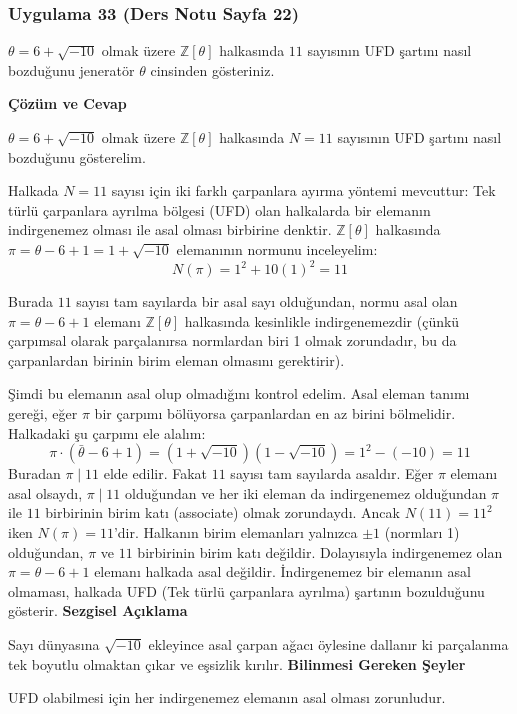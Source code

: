 \documentclass[11pt, a4paper]{article}
\newenvironment{cozum}{
    \vspace{0.5cm}
    \noindent\textcolor{green!60!black}{\faCheckCircle\enspace \textbf{\Large Çözüm ve Cevap}}\par\vspace{0.2cm}
}{}
\newenvironment{sezgisel}{
    \vspace{0.5cm}
    \noindent\textcolor{orange!80!black}{\faLightbulb\enspace \textbf{\Large Sezgisel Açıklama}}\par\vspace{0.2cm}
    \itshape
}{}
\newenvironment{bilgi}{
    \vspace{0.5cm}
    \noindent\textcolor{red!70!black}{\faExclamationTriangle\enspace \textbf{\Large Bilinmesi Gereken Şeyler}}\par\vspace{0.2cm}
}{}
\begin{document}
\newpage
\subsubsection{Uygulama 33 (Ders Notu Sayfa 22)}
\begin{sorubox}
$\theta = 6 + \sqrt{-10}$ olmak üzere $\mathbb{Z}[\theta]$ halkasında $11$ sayısının UFD şartını nasıl bozduğunu jeneratör $\theta$ cinsinden gösteriniz.
\end{sorubox}
\begin{cozum}
$\theta = 6 + \sqrt{-10}$ olmak üzere $\mathbb{Z}[\theta]$ halkasında $N = 11$ sayısının UFD şartını nasıl bozduğunu gösterelim.

Halkada $N = 11$ sayısı için iki farklı çarpanlara ayırma yöntemi mevcuttur:
Tek türlü çarpanlara ayrılma bölgesi (UFD) olan halkalarda bir elemanın indirgenemez olması ile asal olması birbirine denktir. $\mathbb{Z}[\theta]$ halkasında $\pi = \theta - 6 + 1 = 1+\sqrt{-10}$ elemanının normunu inceleyelim:
\[ N(\pi) = 1^2 + 10(1)^2 = 11 \]

Burada $11$ sayısı tam sayılarda bir asal sayı olduğundan, normu asal olan $\pi = \theta - 6 + 1$ elemanı $\mathbb{Z}[\theta]$ halkasında kesinlikle indirgenemezdir (çünkü çarpımsal olarak parçalanırsa normlardan biri 1 olmak zorundadır, bu da çarpanlardan birinin birim eleman olmasını gerektirir).

Şimdi bu elemanın asal olup olmadığını kontrol edelim. Asal eleman tanımı gereği, eğer $\pi$ bir çarpımı bölüyorsa çarpanlardan en az birini bölmelidir. Halkadaki şu çarpımı ele alalım:
\[ \pi \cdot (\bar{\theta} - 6 + 1) = (1+\sqrt{-10})(1-\sqrt{-10}) = 1^2 - (-10) = 11 \]
Buradan $\pi \mid 11$ elde edilir. Fakat $11$ sayısı tam sayılarda asaldır. Eğer $\pi$ elemanı asal olsaydı, $\pi \mid 11$ olduğundan ve her iki eleman da indirgenemez olduğundan $\pi$ ile $11$ birbirinin birim katı (associate) olmak zorundaydı. Ancak $N(11) = 11^2$ iken $N(\pi) = 11$'dir. Halkanın birim elemanları yalnızca $\pm 1$ (normları 1) olduğundan, $\pi$ ve $11$ birbirinin birim katı değildir. Dolayısıyla indirgenemez olan $\pi = \theta - 6 + 1$ elemanı halkada asal değildir. İndirgenemez bir elemanın asal olmaması, halkada UFD (Tek türlü çarpanlara ayrılma) şartının bozulduğunu gösterir.
\end{cozum}
\begin{sezgisel}
Sayı dünyasına $\sqrt{-10}$ ekleyince asal çarpan ağacı öylesine dallanır ki parçalanma tek boyutlu olmaktan çıkar ve eşsizlik kırılır.
\end{sezgisel}
\begin{bilgi}
UFD olabilmesi için her indirgenemez elemanın asal olması zorunludur.
\end{bilgi}
\end{document}
